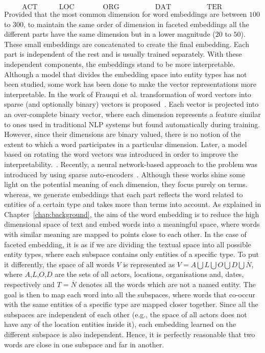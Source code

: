 $$ \quad  \mathrm{ACT} \quad  \qquad  \mathrm{LOC}\qquad \qquad \mathrm{ORG}\qquad \quad \qquad \mathrm{DAT}\qquad \quad  \qquad  \mathrm{TER}\qquad \qquad$$
\mathcenter
Provided that the most common dimension for word embeddings are between $100$ to $300$, to maintain the same order of dimension in faceted embeddings all the different parts have the same dimension but in a lower magnitude ($20$ to $50$). These small embeddings are concatenated to create the final embedding. Each part is independent of the rest and is usually trained separately.
With these independent components, the embeddings stand to be more interpretable. Although a model that divides the embedding space into entity types has not been studied, some work has been done to make the vector representations more interpretable. In the work of Frauqui et al. transformation of word vectors into sparse (and optionally binary) vectors is proposed~. Each vector is projected into an over-complete binary vector, where each dimension represents a feature similar to ones used in traditional NLP systems but found automatically during training. However, since their dimensions are binary valued, there is no notion of the extent to which a word participates in a particular dimension. Later, a model based on rotating the word vectors was introduced in order to improve the interpretability.~. Recently, a neural network-based approach to the problem was introduced by using sparse auto-encoders~. Although these works shine some light on the potential meaning of each dimension, they focus purely on terms. whereas, we generate embeddings that each part reflects the word related to entities of a certain type and takes more than terms into account. As explained in Chapter~\ref{chap:background}, the aim of the word embedding is to reduce the high dimensional space of text and embed words into a meaningful space, where words with similar meaning are mapped to points close to each other. In the case of faceted embedding, it is as if we are dividing the textual space into all possible entity types, where each subspace contains only entities of a specific type. To put it differently, the space of all words $V$ is represented as $V=A\bigcup  L\bigcup  O\bigcup  D\bigcup \overline {N} $, where $A$,$L$,$O$,$D$ are the sets of all actors, locations, organisations and, dates, respectively and $ T=\overline{N}$ denotes all the words which are not a named entity. The goal is then to map each word into all the subspaces, where words that co-occur with the same entities of a specific type are mapped closer together. Since all the subspaces are independent of each other (e.g., the space of all actors does not have any of the location entities inside it), each embedding learned on the different subspace is also independent. Hence, it is perfectly reasonable that two words are close in one subspace and far in another. \\
